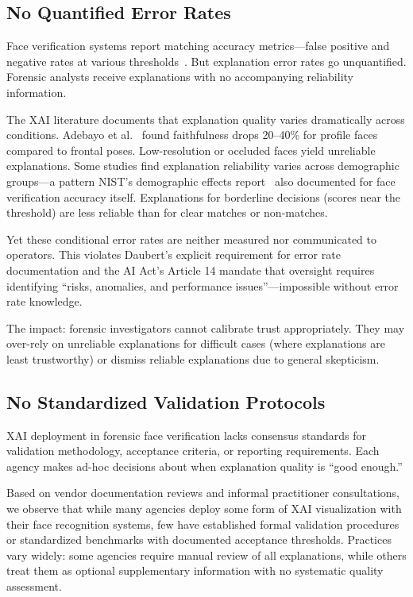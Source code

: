 \subsection{No Quantified Error Rates}

Face verification systems report matching accuracy metrics—false positive and negative rates at various thresholds~\cite{grother2019frvt}. But explanation error rates go unquantified. Forensic analysts receive explanations with no accompanying reliability information.

The XAI literature documents that explanation quality varies dramatically across conditions. Adebayo et al.~\cite{adebayo2018sanity} found faithfulness drops 20--40\% for profile faces compared to frontal poses. Low-resolution or occluded faces yield unreliable explanations. Some studies find explanation reliability varies across demographic groups—a pattern NIST's demographic effects report~\cite{grother2019frvt} also documented for face verification accuracy itself. Explanations for borderline decisions (scores near the threshold) are less reliable than for clear matches or non-matches.

Yet these conditional error rates are neither measured nor communicated to operators. This violates Daubert's explicit requirement for error rate documentation and the AI Act's Article 14 mandate that oversight requires identifying ``risks, anomalies, and performance issues''—impossible without error rate knowledge.

The impact: forensic investigators cannot calibrate trust appropriately. They may over-rely on unreliable explanations for difficult cases (where explanations are least trustworthy) or dismiss reliable explanations due to general skepticism.

\subsection{No Standardized Validation Protocols}

XAI deployment in forensic face verification lacks consensus standards for validation methodology, acceptance criteria, or reporting requirements. Each agency makes ad-hoc decisions about when explanation quality is ``good enough.''

Based on vendor documentation reviews and informal practitioner consultations, we observe that while many agencies deploy some form of XAI visualization with their face recognition systems, few have established formal validation procedures or standardized benchmarks with documented acceptance thresholds. Practices vary widely: some agencies require manual review of all explanations, while others treat them as optional supplementary information with no systematic quality assessment.

